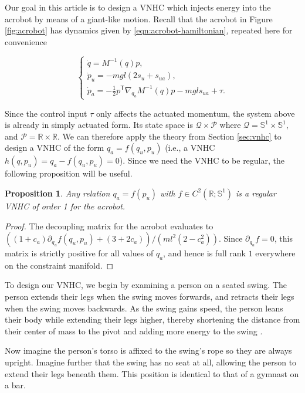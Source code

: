 \documentclass[journal,twoside,web]{ieeecolor}
\newtheorem{prop}{Proposition} %
\newcommand*{\tpose}{^\mathsf{T}}
\newcommand*{\R}{\mathbb{R}}
\newcommand*{\Sone}{\mathbb{S}^1}
\newcommand*{\Minv}{M^\mathsf{-1}}
\begin{document}
Our goal in this article is to design a VNHC which injects energy into the
acrobot by means of a giant-like motion.
Recall that the acrobot in Figure \ref{fig:acrobot} has dynamics given by
\eqref{eqn:acrobot-hamiltonian}, repeated here for convenience{
    \begin{equation*}
     \begin{cases}
        \dot{q} = \Minv(q) p 
        ,\\
        \dot{p}_u = -mgl\left(2s_u + s_{ua}\right) 
        ,\\
        \dot{p}_a =-\frac{1}{2}p\tpose \nabla_{q_a}\Minv(q) p
        - mgl s_{ua} + \tau.
    \end{cases}
\end{equation*}

Since the control input \(\tau\) only affects the actuated momentum,
the system above is already in simply actuated form.
Its state space is \(\mathcal{Q} \times \mathcal{P}\) where
\(\mathcal{Q} = \Sone \times \Sone\), and
\(\mathcal{P} = \R \times \R\).
We can therefore apply the theory from Section \ref{sec:vnhc} to design
a VNHC of the form \(q_a = f(q_u,p_u)\) (i.e., a VNHC 
\(h(q,p_u) = q_a - f(q_u,p_u) = 0\)).
Since we need the VNHC to be regular, the following proposition will be
useful.
\begin{prop}\label{prop:acrobot-fpu-regular}
    Any relation \(q_a = f(p_u)\) 
    with \(f \in C^2\left(\R; \Sone\right)\) is a regular
    VNHC of order 1 for the acrobot.
\end{prop}
\begin{proof}
    The decoupling matrix for the acrobot evaluates to
    \(((1+c_a)\partial_{q_u}f(q_u,p_u) + (3+2c_a))/(ml^2(2-c_a^2))\).
    Since \(\partial_{q_u} f = 0\), this matrix is strictly positive for all values
    of \(q_a\), and hence is full rank \(1\) everywhere on the constraint manifold.
\end{proof}

To design our VNHC, we begin by examining a person on a
seated swing.
The person extends their legs when the swing moves forwards, and retracts their
legs when the swing moves backwards.
As the swing gains speed, the person leans their body while
extending their legs higher, thereby shortening the distance
from their center of mass to the pivot and adding more energy to the swing
\cite{how_to_pump_a_swing}.

Now imagine the person's torso is affixed to the swing's rope so they are
always upright. 
Imagine further that the swing has no seat at all, allowing the person to extend
their legs beneath them. 
This position is identical to that of a gymnast on a bar.

}
\end{document}
